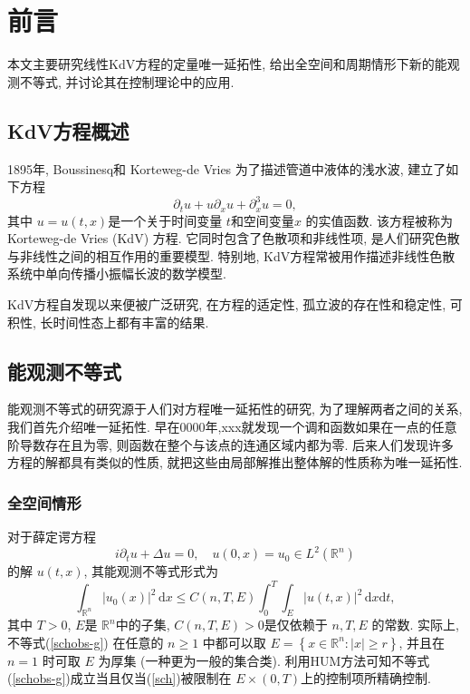 \documentclass[master]{cugthesis}
\newcommand\R{\ensuremath{\mathbb{R}}}
\renewcommand\d{\ensuremath{\,\mathrm{d}}}
\begin{document}
    \makefrontpages 
    \chapter{前言}
    本文主要研究线性KdV方程的定量唯一延拓性, 给出全空间和周期情形下新的能观测不等式, 并讨论其在控制理论中的应用.
    \section{KdV方程概述}
    1895年, Boussinesq\cite{Bouss1877}和 Korteweg-de Vries\cite{Kort1895} 为了描述管道中液体的浅水波, 建立了如下方程
    \begin{equation}
        \partial_t u +u \partial_x u +\partial_x^3 u =0,\label{kdv}
    \end{equation}
    其中 $u=u(t,x)$是一个关于时间变量 $t$和空间变量$x$ 的实值函数. 该方程被称为Korteweg-de Vries (KdV) 方程. 它同时包含了色散项和非线性项, 是人们研究色散与非线性之间的相互作用的重要模型. 特别地, KdV方程常被用作描述非线性色散系统中单向传播小振幅长波的数学模型.
    
    KdV方程自发现以来便被广泛研究, 在方程的适定性, 孤立波的存在性和稳定性, 可积性, 长时间性态上都有丰富的结果. 
    
    \section{能观测不等式}
    能观测不等式的研究源于人们对方程唯一延拓性的研究, 为了理解两者之间的关系, 我们首先介绍唯一延拓性. 早在0000年,xxx就发现一个调和函数如果在一点的任意阶导数存在且为零, 则函数在整个与该点的连通区域内都为零. 后来人们发现许多方程的解都具有类似的性质, 就把这些由局部解推出整体解的性质称为唯一延拓性.
    
    \subsection{全空间情形}
    对于薛定谔方程
    \begin{equation}
        i\partial_t u +\Delta u =0,\quad u(0,x)=u_0\in L^2(\R^n)\label{sch}
    \end{equation}
    的解 $u(t,x)$, 其能观测不等式形式为
    \begin{equation}
        \int_{\R^n}|u_0(x)|^2\d x\le C(n,T,E)\int_0^T\int_E|u(t,x)|^2\d x\mathrm{d}t,\label{schobs-g}
    \end{equation}
    其中 $T>0$, $E$是 $\R^n$中的子集, $C(n,T,E)>0$是仅依赖于 $n,T,E$ 的常数. 实际上, 不等式(\ref{schobs-g}) 在任意的 $n\ge 1$ 中都可以取 $E=\left\lbrace x\in \R^n: |x|\ge r\right\rbrace$\cite{Rosier2009ExactBC}, 并且在 $n=1$ 时可取 $E$ 为厚集\cite{Huang2020ObservableSP} (一种更为一般的集合类). 利用HUM方法\cite{Lions1988ControlabiliteEP}可知不等式 (\ref{schobs-g})成立当且仅当(\ref{sch})被限制在 $E\times (0, T)$上的控制项所精确控制.
    
\end{document}
